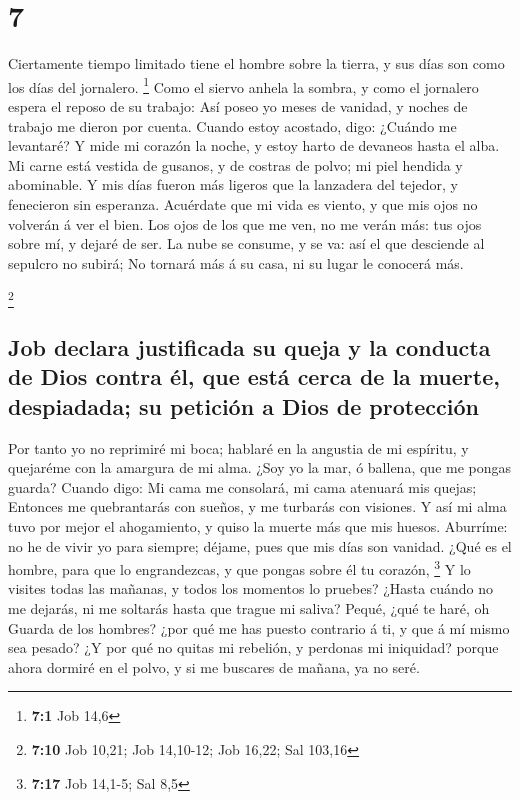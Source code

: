 \hypertarget{section-6}{%
\section{7}\label{section-6}}

 Ciertamente tiempo limitado tiene el hombre sobre la
tierra, y sus días son como los días del jornalero. \footnote{\textbf{7:1}
  Job 14,6}  Como el siervo anhela la sombra, y como el
jornalero espera el reposo de su trabajo:  Así poseo yo
meses de vanidad, y noches de trabajo me dieron por cuenta.
 Cuando estoy acostado, digo: ¿Cuándo me levantaré? Y mide
mi corazón la noche, y estoy harto de devaneos hasta el alba.
 Mi carne está vestida de gusanos, y de costras de polvo;
mi piel hendida y abominable.  Y mis días fueron más
ligeros que la lanzadera del tejedor, y fenecieron sin esperanza.
 Acuérdate que mi vida es viento, y que mis ojos no
volverán á ver el bien.  Los ojos de los que me ven, no me
verán más: tus ojos sobre mí, y dejaré de ser.  La nube se
consume, y se va: así el que desciende al sepulcro no subirá;
 No tornará más á su casa, ni su lugar le conocerá más.

\footnote{\textbf{7:10} Job 10,21; Job 14,10-12; Job 16,22; Sal 103,16}

\hypertarget{job-declara-justificada-su-queja-y-la-conducta-de-dios-contra-uxe9l-que-estuxe1-cerca-de-la-muerte-despiadada-su-peticiuxf3n-a-dios-de-protecciuxf3n}{%
\subsection{Job declara justificada su queja y la conducta de Dios
contra él, que está cerca de la muerte, despiadada; su petición a Dios
de
protección}\label{job-declara-justificada-su-queja-y-la-conducta-de-dios-contra-uxe9l-que-estuxe1-cerca-de-la-muerte-despiadada-su-peticiuxf3n-a-dios-de-protecciuxf3n}}

 Por tanto yo no reprimiré mi boca; hablaré en la
angustia de mi espíritu, y quejaréme con la amargura de mi alma.
 ¿Soy yo la mar, ó ballena, que me pongas guarda?
 Cuando digo: Mi cama me consolará, mi cama atenuará mis
quejas;  Entonces me quebrantarás con sueños, y me
turbarás con visiones.  Y así mi alma tuvo por mejor el
ahogamiento, y quiso la muerte más que mis huesos. 
Aburríme: no he de vivir yo para siempre; déjame, pues que mis días son
vanidad.  ¿Qué es el hombre, para que lo engrandezcas, y
que pongas sobre él tu corazón, \footnote{\textbf{7:17} Job 14,1-5; Sal
  8,5}  Y lo visites todas las mañanas, y todos los
momentos lo pruebes?  ¿Hasta cuándo no me dejarás, ni me
soltarás hasta que trague mi saliva?  Pequé, ¿qué te
haré, oh Guarda de los hombres? ¿por qué me has puesto contrario á ti, y
que á mí mismo sea pesado?  ¿Y por qué no quitas mi
rebelión, y perdonas mi iniquidad? porque ahora dormiré en el polvo, y
si me buscares de mañana, ya no seré.

